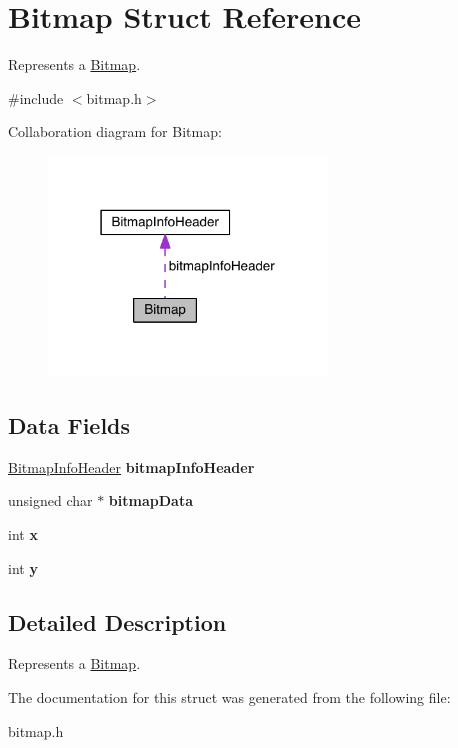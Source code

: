 \hypertarget{struct_bitmap}{}\section{Bitmap Struct Reference}
\label{struct_bitmap}


Represents a \hyperlink{struct_bitmap}{Bitmap}.  




{\ttfamily \#include $<$bitmap.\+h$>$}



Collaboration diagram for Bitmap\+:
\nopagebreak
\begin{figure}[H]
\begin{center}
\leavevmode
\includegraphics[width=210pt]{struct_bitmap__coll__graph}
\end{center}
\end{figure}
\subsection*{Data Fields}
\begin{DoxyCompactItemize}
\item 
\hypertarget{struct_bitmap_a7157ca7f3ce4be47481c472fafd89313}{}\label{struct_bitmap_a7157ca7f3ce4be47481c472fafd89313} 
\hyperlink{struct_bitmap_info_header}{Bitmap\+Info\+Header} {\bfseries bitmap\+Info\+Header}
\item 
\hypertarget{struct_bitmap_a586c4bcc42cf22a033e8f60f24f627f0}{}\label{struct_bitmap_a586c4bcc42cf22a033e8f60f24f627f0} 
unsigned char $\ast$ {\bfseries bitmap\+Data}
\item 
\hypertarget{struct_bitmap_a6150e0515f7202e2fb518f7206ed97dc}{}\label{struct_bitmap_a6150e0515f7202e2fb518f7206ed97dc} 
int {\bfseries x}
\item 
\hypertarget{struct_bitmap_a0a2f84ed7838f07779ae24c5a9086d33}{}\label{struct_bitmap_a0a2f84ed7838f07779ae24c5a9086d33} 
int {\bfseries y}
\end{DoxyCompactItemize}


\subsection{Detailed Description}
Represents a \hyperlink{struct_bitmap}{Bitmap}. 

The documentation for this struct was generated from the following file\+:\begin{DoxyCompactItemize}
\item 
bitmap.\+h\end{DoxyCompactItemize}
